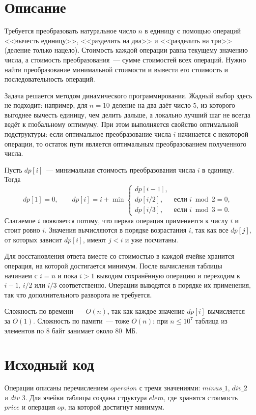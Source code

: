 \section{Описание}
Требуется преобразовать натуральное число $n$ в единицу с помощью операций <<вычесть единицу>>, <<разделить на два>> и <<разделить на три>> (деление только нацело). Стоимость каждой операции равна текущему значению числа, а стоимость преобразования~--- сумме стоимостей всех операций. Нужно найти преобразование минимальной стоимости и вывести его стоимость и последовательность операций.

Задача решается методом динамического программирования. Жадный выбор здесь не подходит: например, для $n = 10$ деление на два даёт число 5, из которого выгоднее вычесть единицу, чем делить дальше, а локально лучший шаг не всегда ведёт к глобальному оптимуму. При этом выполняется свойство оптимальной подструктуры: если оптимальное преобразование числа $i$ начинается с некоторой операции, то остаток пути является оптимальным преобразованием полученного числа.

Пусть $dp[i]$~--- минимальная стоимость преобразования числа $i$ в единицу. Тогда
\begin{equation*}
dp[1] = 0, \qquad
dp[i] = i + \min
\begin{cases}
dp[i-1], \\
dp[i/2], & \text{если } i \bmod 2 = 0, \\
dp[i/3], & \text{если } i \bmod 3 = 0.
\end{cases}
\end{equation*}
Слагаемое $i$ появляется потому, что первая операция применяется к числу $i$ и стоит ровно $i$. Значения вычисляются в порядке возрастания $i$, так как все $dp[j]$, от которых зависит $dp[i]$, имеют $j < i$ и уже посчитаны.

Для восстановления ответа вместе со стоимостью в каждой ячейке хранится операция, на которой достигается минимум. После вычисления таблицы начинаем с $i = n$ и пока $i > 1$ выводим сохранённую операцию и переходим к $i-1$, $i/2$ или $i/3$ соответственно. Операции выводятся в порядке их применения, так что дополнительного разворота не требуется.

Сложность по времени~--- $O(n)$, так как каждое значение $dp[i]$ вычисляется за $O(1)$. Сложность по памяти~--- тоже $O(n)$: при $n \le 10^7$ таблица из элементов по 8 байт занимает около 80~МБ.

\pagebreak

\section{Исходный код}
Операции описаны перечислением $operaion$ с тремя значениями: $minus\_1$, $div\_2$ и $div\_3$. Для ячейки таблицы создана структура $elem$, где хранятся стоимость $price$ и операция $op$, на которой достигнут минимум.

